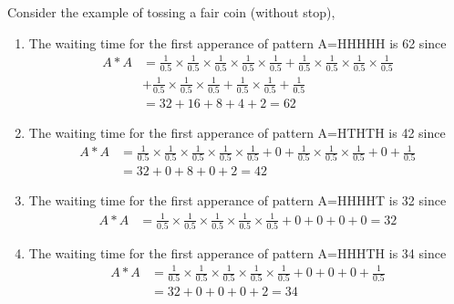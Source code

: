 \begin{example}
Consider the example of tossing a fair coin (without stop), 
  \begin{enumerate}
    \item The waiting time for the first apperance of pattern A=HHHHH is 62 
    since
      \begin{align*}
        A \ast A 
          &= \frac{1}{0.5} \times \frac{1}{0.5} \times \frac{1}{0.5} 
             \times \frac{1}{0.5} \times \frac{1}{0.5} 
             + \frac{1}{0.5} \times \frac{1}{0.5} \times \frac{1}{0.5} \times 
             \frac{1}{0.5}   \\
          &+ \frac{1}{0.5} \times \frac{1}{0.5} \times \frac{1}{0.5} 
             + \frac{1}{0.5} \times \frac{1}{0.5} + \frac{1}{0.5}   \\ 
          &= 32 + 16 + 8 + 4 + 2 = 62
     \end{align*}
   \item The waiting time for the first apperance of pattern A=HTHTH is 42
    since
     \begin{align*}
        A \ast A 
          &= \frac{1}{0.5} \times \frac{1}{0.5} \times \frac{1}{0.5} 
             \times \frac{1}{0.5} \times \frac{1}{0.5} + 0 
             + \frac{1}{0.5} \times \frac{1}{0.5} \times \frac{1}{0.5} 
             + 0 + \frac{1}{0.5}  \\
          &= 32+0+8+0+2 = 42 
   \end{align*}
   \item The waiting time for the first apperance of pattern A=HHHHT is 32
    since
     \begin{align*}
        A \ast A 
          &= \frac{1}{0.5} \times \frac{1}{0.5} \times \frac{1}{0.5} 
             \times \frac{1}{0.5} \times \frac{1}{0.5} + 0 + 0 + 0 + 0
           = 32
     \end{align*}
   \item The waiting time for the first apperance of pattern A=HHHTH is 34
    since
     \begin{align*}
        A \ast A 
          &= \frac{1}{0.5} \times \frac{1}{0.5} \times \frac{1}{0.5} 
             \times \frac{1}{0.5} \times \frac{1}{0.5} + 0 + 0 + 0 
             + \frac{1}{0.5} \\
          &= 32+0+0+0+2=34 
     \end{align*}
  \end{enumerate}
\end{example}


